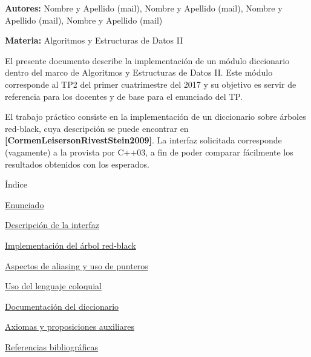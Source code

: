 
\begin{DoxyItemize}
\item {\bfseries Autores\+:} Nombre y Apellido (mail), Nombre y Apellido (mail), Nombre y Apellido (mail), Nombre y Apellido (mail)
\item {\bfseries Materia\+:} Algoritmos y Estructuras de Datos II
\end{DoxyItemize}

El presente documento describe la implementación de un módulo diccionario dentro del marco de Algoritmos y Estructuras de Datos II. Este módulo corresponde al T\+P2 del primer cuatrimestre del 2017 y su objetivo es servir de referencia para los docentes y de base para el enunciado del TP.

El trabajo práctico consiste en la implementación de un diccionario sobre árboles red-\/black, cuya descripción se puede encontrar en {\bfseries [Cormen\+Leiserson\+Rivest\+Stein2009]}. La interfaz solicitada corresponde (vagamente) a la provista por C++03, a fin de poder comparar fácilmente los resultados obtenidos con los esperados.

\begin{DoxyParagraph}{Índice}

\end{DoxyParagraph}

\begin{DoxyItemize}
\item \hyperlink{Enunciado}{Enunciado}
\item \hyperlink{Interfaz}{Descripción de la interfaz}
\item \hyperlink{Implementacion}{Implementación del árbol red-\/black}
\item \hyperlink{Aliasing}{Aspectos de aliasing y uso de punteros}
\item \hyperlink{Castellano}{Uso del lenguaje coloquial}
\item \hyperlink{classaed2_1_1map}{Documentación del diccionario }
\item \hyperlink{axiomas}{Axiomas y proposiciones auxiliares}
\item \hyperlink{citelist}{Referencias bibliográficas} 
\end{DoxyItemize}
